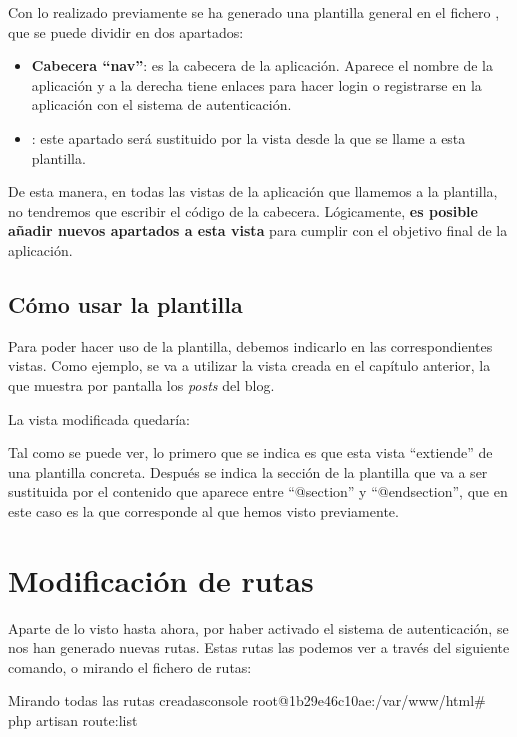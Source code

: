 Con lo realizado previamente se ha generado una plantilla general en el fichero , que se puede dividir en dos apartados:

\begin{itemize}
    \item \textbf{Cabecera “nav”}: es la cabecera de la aplicación. Aparece el nombre de la aplicación y a la derecha tiene enlaces para hacer login o registrarse en la aplicación con el sistema de autenticación.

    \item {}: este apartado será sustituido por la vista desde la que se llame a esta plantilla.
\end{itemize}

De esta manera, en todas las vistas de la aplicación que llamemos a la plantilla, no tendremos que escribir el código de la cabecera. Lógicamente, \textbf{es posible añadir nuevos apartados a esta vista} para cumplir con el objetivo final de la aplicación.

\section{Cómo usar la plantilla}

Para poder hacer uso de la plantilla, debemos indicarlo en las correspondientes vistas. Como ejemplo, se va a utilizar la vista creada en el capítulo anterior, la que muestra por pantalla los \textit{posts} del blog.

La vista modificada quedaría:


Tal como se puede ver, lo primero que se indica es que esta vista “extiende” de una plantilla concreta. Después se indica la sección de la plantilla que va a ser sustituida por el contenido que aparece entre “@section” y “@endsection”, que en este caso es la que corresponde al  que hemos visto previamente.


\chapter{Modificación de rutas}
Aparte de lo visto hasta ahora, por haber activado el sistema de autenticación, se nos han generado nuevas rutas. Estas rutas las podemos ver a través del siguiente comando, o mirando el fichero de rutas:

\begin{mycode}{Mirando todas las rutas creadas}{console}{}
root@1b29e46c10ae:/var/www/html# php artisan route:list
\end{mycode}
